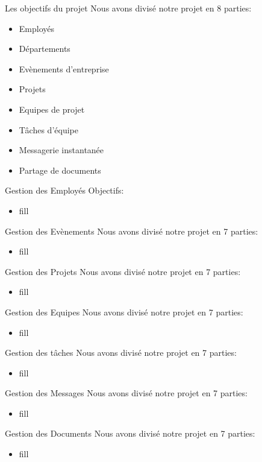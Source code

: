 \begin{frame}{Les objectifs du projet}
 Nous avons divisé notre projet en 8 parties:
  \begin{itemize}
  \item Employés
\item Départements
 \item Evènements d'entreprise
 \item Projets
 \item Equipes de projet
 \item Tâches d'équipe
  \item Messagerie instantanée
\item Partage de documents
    \end{itemize}
\end{frame}

\begin{frame}{Gestion des Employés}
Objectifs:
  \begin{itemize}
\item fill
    \end{itemize}
\end{frame}

\begin{frame}{Gestion des Evènements}
 Nous avons divisé notre projet en 7 parties:
  \begin{itemize}
\item fill
    \end{itemize}
\end{frame}


\begin{frame}{Gestion des Projets}
 Nous avons divisé notre projet en 7 parties:
  \begin{itemize}
\item fill
    \end{itemize}
\end{frame}

\begin{frame}{Gestion des Equipes}
 Nous avons divisé notre projet en 7 parties:
  \begin{itemize}
\item fill
    \end{itemize}
\end{frame}

\begin{frame}{Gestion des tâches}
 Nous avons divisé notre projet en 7 parties:
  \begin{itemize}
\item fill
    \end{itemize}
\end{frame}

\begin{frame}{Gestion des Messages}
 Nous avons divisé notre projet en 7 parties:
  \begin{itemize}
\item fill
    \end{itemize}
\end{frame}

\begin{frame}{Gestion des Documents}
 Nous avons divisé notre projet en 7 parties:
  \begin{itemize}
\item fill
    \end{itemize}
\end{frame}


